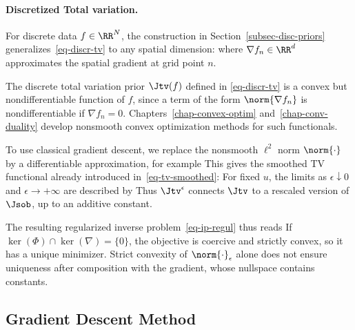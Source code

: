 \paragraph{Discretized Total variation.}

For discrete data $f \in \RR^N$, the construction in Section~\ref{subsec-disc-priors} generalizes~\eqref{eq-discr-tv} to any spatial dimension:
where $\nabla f_n \in \RR^d$ approximates the spatial gradient at grid point $n$.


The discrete total variation prior $\Jtv(f)$ defined in \eqref{eq-discr-tv} is a convex but nondifferentiable function of $f$, since a term of the form $\norm{\nabla f_n}$ is nondifferentiable if $\nabla f_n=0$.
%
Chapters~\ref{chap-convex-optim} and~\ref{chap-conv-duality} develop nonsmooth convex optimization methods for such functionals.

To use classical gradient descent, we replace the nonsmooth $\ell^2$ norm $\norm{\cdot}$ by a differentiable approximation, for example
This gives the smoothed TV functional already introduced in~\eqref{eq-tv-smoothed}:
For fixed $u$, the limits as $\epsilon\downarrow0$ and $\epsilon\to+\infty$ are described by
Thus $\Jtv^\epsilon$ connects $\Jtv$ to a rescaled version of $\Jsob$, up to an additive constant.

The resulting regularized inverse problem~\eqref{eq-ip-regul} thus reads
If $\ker(\Phi)\cap\ker(\nabla)=\{0\}$, the objective is coercive and strictly convex, so it has a unique minimizer. Strict convexity of $\norm{\cdot}_\epsilon$ alone does not ensure uniqueness after composition with the gradient, whose nullspace contains constants.



\subsection{Gradient Descent Method}
\label{sec-ip-grad-descent}

